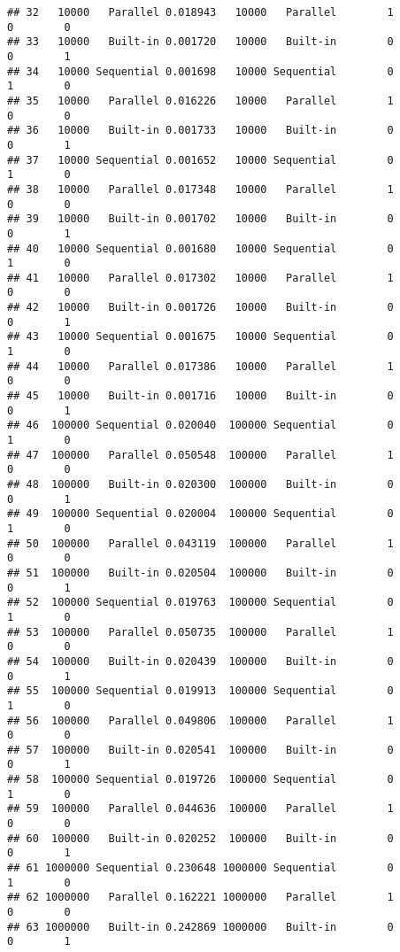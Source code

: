 \documentclass[
]{article}
\begin{document}
\begin{verbatim}
## 32   10000   Parallel 0.018943   10000   Parallel        1          0        0
## 33   10000   Built-in 0.001720   10000   Built-in        0          0        1
## 34   10000 Sequential 0.001698   10000 Sequential        0          1        0
## 35   10000   Parallel 0.016226   10000   Parallel        1          0        0
## 36   10000   Built-in 0.001733   10000   Built-in        0          0        1
## 37   10000 Sequential 0.001652   10000 Sequential        0          1        0
## 38   10000   Parallel 0.017348   10000   Parallel        1          0        0
## 39   10000   Built-in 0.001702   10000   Built-in        0          0        1
## 40   10000 Sequential 0.001680   10000 Sequential        0          1        0
## 41   10000   Parallel 0.017302   10000   Parallel        1          0        0
## 42   10000   Built-in 0.001726   10000   Built-in        0          0        1
## 43   10000 Sequential 0.001675   10000 Sequential        0          1        0
## 44   10000   Parallel 0.017386   10000   Parallel        1          0        0
## 45   10000   Built-in 0.001716   10000   Built-in        0          0        1
## 46  100000 Sequential 0.020040  100000 Sequential        0          1        0
## 47  100000   Parallel 0.050548  100000   Parallel        1          0        0
## 48  100000   Built-in 0.020300  100000   Built-in        0          0        1
## 49  100000 Sequential 0.020004  100000 Sequential        0          1        0
## 50  100000   Parallel 0.043119  100000   Parallel        1          0        0
## 51  100000   Built-in 0.020504  100000   Built-in        0          0        1
## 52  100000 Sequential 0.019763  100000 Sequential        0          1        0
## 53  100000   Parallel 0.050735  100000   Parallel        1          0        0
## 54  100000   Built-in 0.020439  100000   Built-in        0          0        1
## 55  100000 Sequential 0.019913  100000 Sequential        0          1        0
## 56  100000   Parallel 0.049806  100000   Parallel        1          0        0
## 57  100000   Built-in 0.020541  100000   Built-in        0          0        1
## 58  100000 Sequential 0.019726  100000 Sequential        0          1        0
## 59  100000   Parallel 0.044636  100000   Parallel        1          0        0
## 60  100000   Built-in 0.020252  100000   Built-in        0          0        1
## 61 1000000 Sequential 0.230648 1000000 Sequential        0          1        0
## 62 1000000   Parallel 0.162221 1000000   Parallel        1          0        0
## 63 1000000   Built-in 0.242869 1000000   Built-in        0          0        1

\end{verbatim}
\end{document}

